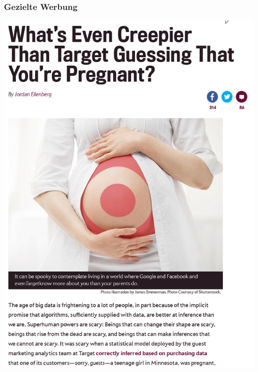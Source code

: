 \documentclass[12pt]{beamer}
\begin{document}
\begin{frame}
\begin{center}
{    }
  \end{center}
\end{frame}

\begin{frame}
  \frametitle{Gezielte Werbung}
  \pause
  \begin{center}
    \includegraphics[height=0.8\textheight]{img/pregnant.png}
  \end{center}
\end{frame}
\end{document}
